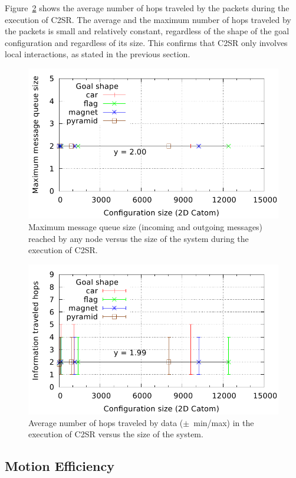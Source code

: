 Figure~\ref{fig:reconfiguration:hop} shows the average number of hops traveled by the packets during the execution of C2SR. The average and the maximum number of hops traveled by the packets is small and relatively constant, regardless of the shape of the goal configuration and regardless of its size. This confirms that C2SR only involves local interactions, as stated in the previous section.

\begin{figure}[!h]
	\centering
	\includegraphics[width=0.7\linewidth]{images/reconfiguration/graphs/queue}
	\caption{Maximum message queue size (incoming and outgoing messages) reached by any node  versus the size of the system during the execution of C2SR.}
	\label{fig:reconfiguration:queue}
\end{figure}

\begin{figure}[!h]
	\centering
	\includegraphics[width=0.7\linewidth]{images/reconfiguration/graphs/hop}
	\caption{Average number of hops traveled by data ($\pm$~min/max) in the execution of C2SR versus the size of the system.}
	\label{fig:reconfiguration:hop}
\end{figure}

\subsection{Motion Efficiency}

